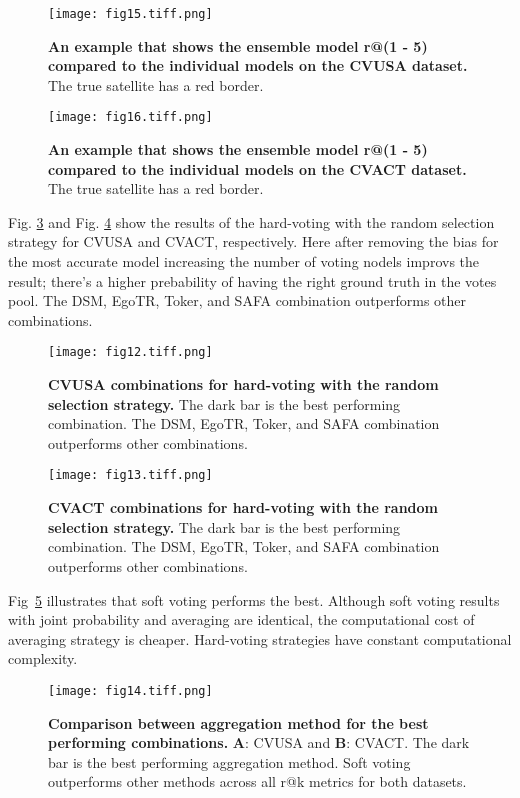 \documentclass[10pt,letterpaper]{article}
\newif\ifhighlight
\newcommand{\hlb}[1]{\ifhighlight{\hl{#1}}\else{#1}\fi}
\begin{document}
\begin{figure}[!ht]
  \caption{{\bf An example that shows the ensemble model r@(1 - 5) compared to the individual models on the CVUSA dataset.} The true satellite has a red border.}
  \texttt{[image: fig15.tiff.png]}
  \label{fig15}
\end{figure}

\begin{figure}[!ht]
  \caption{{\bf An example that shows the ensemble model r@(1 - 5) compared to the individual models on the CVACT dataset.}  The true satellite has a red border.}
  \texttt{[image: fig16.tiff.png]}
  \label{fig16}
\end{figure}

\hlb{Fig.} \ref{fig12} and \hlb{Fig.} \ref{fig13} show the results of the hard-voting with the random selection strategy for CVUSA and CVACT, respectively. \hlb{Here after removing the bias for the most accurate model increasing the number of voting nodels improvs the result; there's a higher prebability of having the right ground truth in the votes pool.} The DSM, EgoTR, Toker, and SAFA combination outperforms other combinations.

\begin{figure}[!ht]
  \caption{{\bf CVUSA combinations for hard-voting with the random selection strategy.} The dark bar is the best performing combination. The DSM, EgoTR, Toker, and SAFA combination outperforms other combinations. }
  \texttt{[image: fig12.tiff.png]}
  \label{fig12}
\end{figure}

\begin{figure}[!ht]
  \caption{{\bf CVACT combinations for hard-voting with the random selection strategy.} The dark bar is the best performing combination. The DSM, EgoTR, Toker, and SAFA combination outperforms other combinations.}
  \texttt{[image: fig13.tiff.png]}
  \label{fig13}
\end{figure}

\FloatBarrier

Fig~\ref{fig14} illustrates that soft voting performs the best. Although soft voting results with joint probability and averaging are identical, the computational cost of averaging strategy is cheaper. Hard-voting strategies have constant computational complexity. 

\begin{figure}[!ht]
  \caption{{\bf Comparison between aggregation method for the best performing combinations. } {\bf A}: CVUSA and {\bf B}: CVACT.  The dark bar is the best performing aggregation method. Soft voting outperforms other methods across all r@k metrics for both datasets.}
  \texttt{[image: fig14.tiff.png]}
  \label{fig14}
\end{figure}
\end{document}
